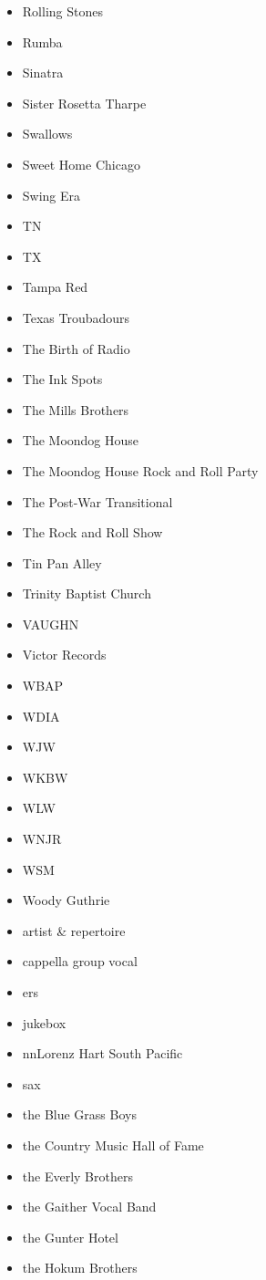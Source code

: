 \documentclass[12pt,a4paper]{article}
\begin{document}
\begin{itemize}
  \item Rolling Stones
  \item Rumba
  \item Sinatra
  \item Sister Rosetta Tharpe
  \item Swallows
  \item Sweet Home Chicago
  \item Swing Era
  \item TN
  \item TX
  \item Tampa Red
  \item Texas Troubadours
  \item The Birth of Radio
  \item The Ink Spots
  \item The Mills Brothers
  \item The Moondog House
  \item The Moondog House Rock and Roll Party
  \item The Post-War Transitional
  \item The Rock and Roll Show
  \item Tin Pan Alley
  \item Trinity Baptist Church
  \item VAUGHN
  \item Victor  Records
  \item WBAP
  \item WDIA
  \item WJW
  \item WKBW
  \item WLW
  \item WNJR
  \item WSM
  \item Woody Guthrie
  \item artist \& repertoire
  \item cappella group vocal
  \item ers
  \item jukebox
  \item nnLorenz Hart South Pacific
  \item sax
  \item the Blue Grass Boys
  \item the Country Music Hall of Fame
  \item the Everly Brothers
  \item the Gaither Vocal Band
  \item the Gunter Hotel
  \item the Hokum Brothers

\end{itemize}
\end{document}

